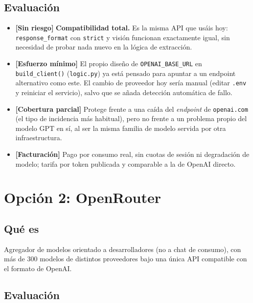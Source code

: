 \documentclass[11pt,a4paper]{article}
\newcommand{\advertencia}[1]{\textcolor{riesgomedio}{\textbf{[#1]}}}
\newcommand{\ok}[1]{\textcolor{riesgobajo}{\textbf{[#1]}}}
\begin{document}
\subsection{Evaluación}

\begin{itemize}
    \item \ok{Sin riesgo} \textbf{Compatibilidad total.} Es la misma API que
    usáis hoy: \texttt{response\_format} con \texttt{strict} y visión funcionan
    exactamente igual, sin necesidad de probar nada nuevo en la lógica de
    extracción.
    \item \ok{Esfuerzo mínimo} El propio diseño de \texttt{OPENAI\_BASE\_URL} en
    \texttt{build\_client()} (\texttt{logic.py}) ya está pensado para apuntar a
    un endpoint alternativo como este. El cambio de proveedor hoy sería manual
    (editar \texttt{.env} y reiniciar el servicio), salvo que se añada
    detección automática de fallo.
    \item \advertencia{Cobertura parcial} Protege frente a una caída del
    \emph{endpoint} de \texttt{openai.com} (el tipo de incidencia más habitual),
    pero no frente a un problema propio del modelo GPT en sí, al ser la misma
    familia de modelo servida por otra infraestructura.
    \item \ok{Facturación} Pago por consumo real, sin cuotas de sesión ni
    degradación de modelo; tarifa por token publicada y comparable a la de
    OpenAI directo.
\end{itemize}

\section{Opción 2: OpenRouter}

\subsection{Qué es}
Agregador de modelos orientado a desarrolladores (no a chat de consumo), con más
de 300 modelos de distintos proveedores bajo una única API compatible con el
formato de OpenAI.

\subsection{Evaluación}
\end{document}

